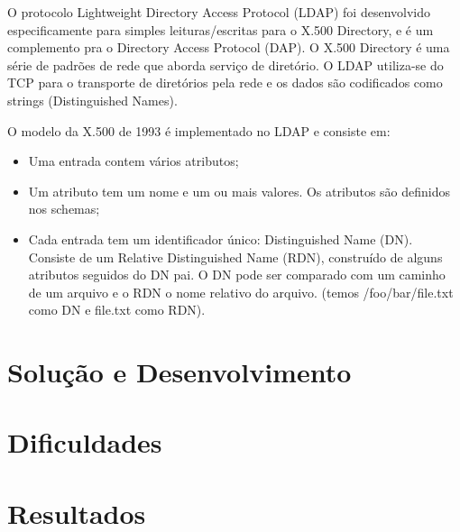 O protocolo Lightweight Directory Access Protocol (LDAP) foi desenvolvido especificamente
para simples leituras/escritas para o X.500 Directory, e é um complemento pra o Directory
Access Protocol (DAP). O X.500 Directory é uma série de padrões de rede que aborda serviço
de diretório. O LDAP utiliza-se do TCP para o transporte de diretórios pela rede e os dados
são codificados como strings (Distinguished Names).

O modelo da X.500 de 1993 é implementado no LDAP e consiste em:
\begin{itemize}
  \item Uma entrada contem vários atributos;
  \item Um atributo tem um nome e um ou mais valores. Os atributos são definidos nos schemas;
  \item Cada entrada tem um identificador único: Distinguished Name (DN). Consiste de um
    Relative Distinguished Name (RDN), construído de alguns atributos seguidos do DN pai.
    O DN pode ser comparado com um caminho de um arquivo e o RDN o nome relativo do arquivo.
    (temos /foo/bar/file.txt como DN e file.txt como RDN).
\end{itemize}

\section{Solução e Desenvolvimento}

\section{Dificuldades}

\section{Resultados}

